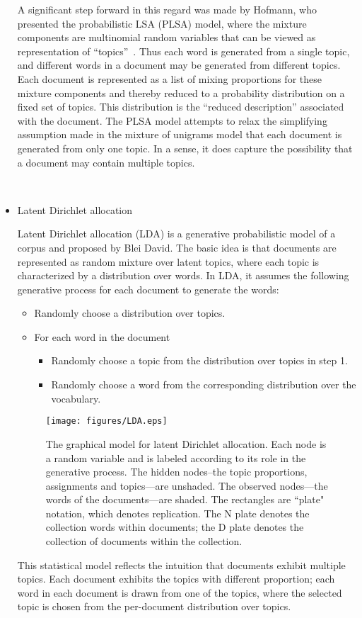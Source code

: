 \begin{itemize}
A significant step forward in this regard was made by Hofmann, who presented the probabilistic LSA (PLSA) model, where the mixture components are multinomial random variables that can be viewed as representation of “topics”~\cite{hofmann1999probabilistic}. Thus each word is generated from a single topic, and different words in a document may be generated from different topics. Each document is represented as a list of mixing proportions for these mixture components and thereby reduced to a probability distribution on a fixed set of topics. This distribution is the ``reduced description'' associated with the document. The PLSA model attempts to relax the simplifying assumption made in the mixture of unigrams model that each document is generated from only one topic. In a sense, it does capture the possibility that a document may contain multiple topics. 

\\
\item Latent Dirichlet allocation

Latent Dirichlet allocation (LDA) is a generative probabilistic model of a corpus and proposed by Blei David. The basic idea is that documents are represented as random mixture over latent topics, where each topic is characterized by a distribution over words. In LDA, it assumes the following generative process for each document to generate the words:

\begin{itemize}
\item Randomly choose a distribution over topics.

\item For each word in the document

  \begin {itemize}
\item Randomly choose a topic from the distribution over topics in step 1.
\item Randomly choose a word from the corresponding distribution over the vocabulary.
  \end{itemize}
\end{itemize}
\begin{figure}[!htb]
  \centering
  \texttt{[image: figures/LDA.eps]}
  \caption{The graphical model for latent Dirichlet allocation. Each node is a
random variable and is labeled according to its role in the generative
process. The hidden nodes–the topic
proportions, assignments and topics—are unshaded. The observed
nodes—the words of the documents—are shaded. The rectangles are
``plate" notation, which denotes replication. The N plate denotes the
collection words within documents; the D plate denotes the collection
of documents within the collection.}
  \label{fig:lds}
\end{figure}

This statistical model reflects the intuition that documents exhibit multiple topics. Each document exhibits the topics with different proportion; each word in each document is drawn from one of the topics, where the selected topic is chosen from the per-document distribution over topics. 
 
\end{itemize}

